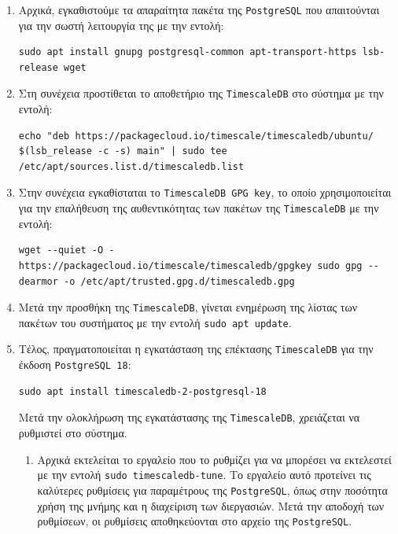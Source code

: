 \documentclass[a4paper,12pt]{article}
\begin{document}
\begin{enumerate}

\item Αρχικά, εγκαθιστούμε τα απαραίτητα πακέτα της \texttt{PostgreSQL} που απαιτούνται για την σωστή λειτουργία της με την εντολή: 

\begin{lstlisting}
sudo apt install gnupg postgresql-common apt-transport-https lsb-release wget
\end{lstlisting}

\item Στη συνέχεια προστίθεται το αποθετήριο της \texttt{TimescaleDB} στο σύστημα με την εντολή:

\begin{lstlisting}
echo "deb https://packagecloud.io/timescale/timescaledb/ubuntu/ $(lsb_release -c -s) main" | sudo tee /etc/apt/sources.list.d/timescaledb.list
\end{lstlisting}

\item Στην συνέχεια εγκαθίσταται το \texttt{TimescaleDB GPG key}, το οποίο χρησιμοποιείται για την επαλήθευση της αυθεντικότητας των πακέτων της \texttt{TimescaleDB} με την εντολή:

\begin{lstlisting}
wget --quiet -O - https://packagecloud.io/timescale/timescaledb/gpgkey sudo gpg --dearmor -o /etc/apt/trusted.gpg.d/timescaledb.gpg
\end{lstlisting}

\item Μετά την προσθήκη της \texttt{TimescaleDB}, γίνεται ενημέρωση της λίστας των πακέτων του συστήματος με την εντολή \texttt{sudo apt update}.

\item Τέλος, πραγματοποιείται η εγκατάσταση της επέκτασης \texttt{TimescaleDB} για την έκδοση \texttt{PostgreSQL 18}:

\begin{lstlisting}
sudo apt install timescaledb-2-postgresql-18
\end{lstlisting}

Μετά την ολοκλήρωση της εγκατάστασης της \texttt{TimescaleDB}, χρειάζεται να ρυθμιστεί στο σύστημα.

\begin{enumerate}

\item Αρχικά εκτελείται το εργαλείο που το ρυθμίζει για να μπορέσει να εκτελεστεί με την εντολή \texttt{sudo timescaledb-tune}. Το εργαλείο αυτό προτείνει τις καλύτερες ρυθμίσεις για παραμέτρους της \texttt{PostgreSQL}, όπως στην ποσότητα χρήση της μνήμης και η διαχείριση των διεργασιών. Μετά την αποδοχή των ρυθμίσεων, οι ρυθμίσεις αποθηκεύονται στο αρχείο της \texttt{PostgreSQL}.


\end{enumerate}
\end{enumerate}
\end{document}
